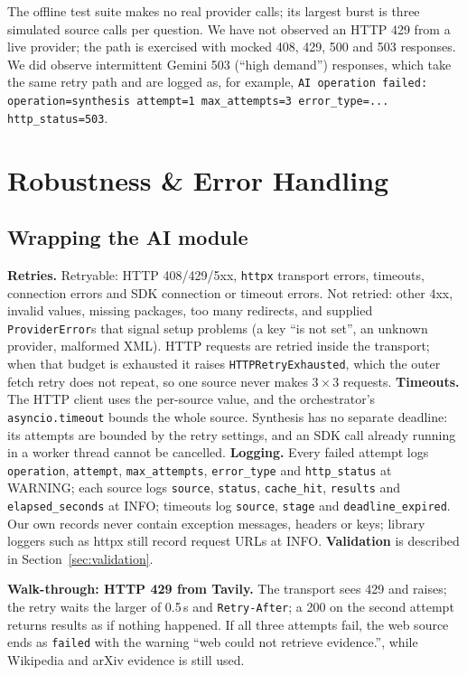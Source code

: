 \documentclass[11pt,a4paper]{article}
\newcommand{\cmd}[1]{\texttt{#1}}
\begin{document}
The offline test suite makes no real provider calls; its largest burst is three
simulated source calls per question. We have not observed an HTTP 429 from a live
provider; the path is exercised with mocked 408, 429, 500 and 503 responses. We
did observe intermittent Gemini 503 (``high demand'') responses, which take the
same retry path and are logged as, for example,
\cmd{AI operation failed: operation=synthesis attempt=1 max\_attempts=3
error\_type=... http\_status=503}.

\section{Robustness \& Error Handling}\label{sec:robustness}

\subsection{Wrapping the AI module}

\textbf{Retries.} Retryable: HTTP 408/429/5xx, \texttt{httpx} transport errors,
timeouts, connection errors and SDK connection or timeout errors. Not retried:
other 4xx, invalid values, missing packages, too many redirects, and supplied
\cmd{ProviderError}s that signal setup problems (a key ``is not set'', an unknown
provider, malformed XML). HTTP requests are retried inside the transport; when
that budget is exhausted it raises \texttt{HTTPRetryExhausted}, which the outer
fetch retry does not repeat, so one source never makes $3\times3$ requests.
\textbf{Timeouts.} The HTTP client uses the per-source value, and the
orchestrator's \cmd{asyncio.timeout} bounds the whole source. Synthesis has no
separate deadline: its attempts are bounded by the retry settings, and an SDK call
already running in a worker thread cannot be cancelled. \textbf{Logging.} Every
failed attempt logs \cmd{operation}, \cmd{attempt}, \cmd{max\_attempts},
\cmd{error\_type} and \cmd{http\_status} at WARNING; each source logs
\cmd{source}, \cmd{status}, \cmd{cache\_hit}, \cmd{results} and
\cmd{elapsed\_seconds} at INFO; timeouts log \cmd{source}, \cmd{stage} and
\cmd{deadline\_expired}. Our own records never contain exception messages,
headers or keys; library loggers such as httpx still record request URLs at
INFO. \textbf{Validation} is described in Section~\ref{sec:validation}.

\textbf{Walk-through: HTTP 429 from Tavily.} The transport sees 429 and raises;
the retry waits the larger of 0.5\,s and \texttt{Retry-After}; a 200 on the
second attempt returns results as if nothing happened. If all three attempts
fail, the web source ends as \cmd{failed} with the warning ``web could not
retrieve evidence.'', while Wikipedia and arXiv evidence is still used.
\end{document}
